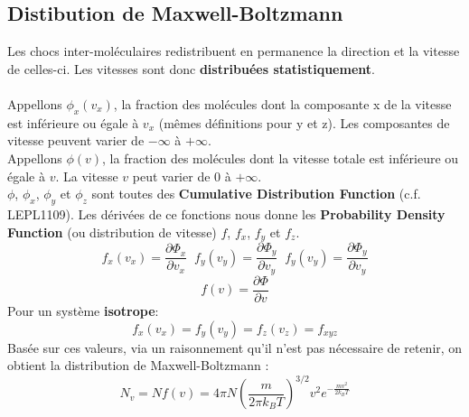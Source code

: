 \documentclass{article}
\begin{document}
    \subsection{Distibution de Maxwell-Boltzmann}
        Les chocs inter-moléculaires redistribuent en permanence la direction et la vitesse de celles-ci. Les vitesses sont donc \textbf{distribuées statistiquement}.\\\\
        Appellons $\phi_x (v_x)$, la fraction des molécules dont la composante x de la vitesse est inférieure ou égale à $v_x$ (mêmes définitions pour y et z).
        Les composantes de vitesse peuvent varier de $-\infty$ à $+\infty$. \\
        Appellons $\phi(v)$, la fraction des molécules dont la vitesse totale est inférieure ou égale à $v$.
        La vitesse $v$ peut varier de 0 à $+\infty$. \\
        $\phi$, $\phi_x$, $\phi_y$ et $\phi_z$ sont toutes des \textbf{Cumulative Distribution Function} (c.f. LEPL1109).
        Les dérivées de ce fonctions nous donne les \textbf{Probability Density Function} (ou distribution de vitesse) $f$, $f_x$, $f_y$ et $f_z$.
        $$
        f_x(v_x) = \frac{\partial \Phi_x}{\partial v_x} \; \; f_y(v_y) = \frac{\partial \Phi_y}{\partial v_y} \; \; f_y(v_y) = \frac{\partial \Phi_y}{\partial v_y}
        $$
        $$
        f(v) = \frac{\partial \Phi}{\partial v}
        $$
        Pour un système \textbf{isotrope}:
        $$
        f_x(v_x) = f_y(v_y) = f_z(v_z) = f_{xyz}
        $$
        Basée sur ces valeurs, via un raisonnement qu'il n'est pas nécessaire de retenir, on obtient la distribution de Maxwell-Boltzmann :
        $$
        N_v = N f(v) = 4 \pi N \left( \frac{m}{2\pi k_B T} \right) ^{3/2} v^2 e^{-\frac{m v^2}{2 k_B T}}
        $$
\end{document}
